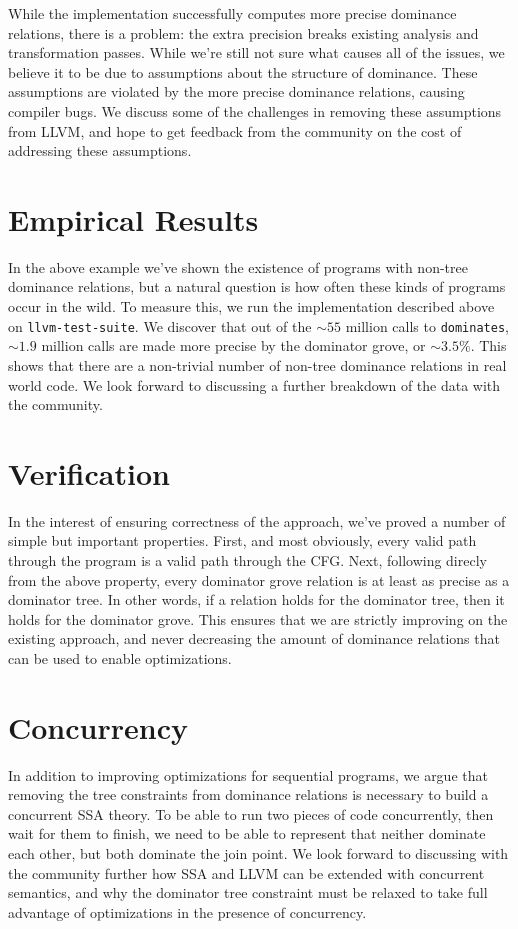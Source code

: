\documentclass[a4paper,twocolumn]{article}
\begin{document}
While the implementation successfully computes more precise dominance
relations, there is a problem: the extra precision breaks existing analysis and
transformation passes. While we're still not sure what causes all of the issues, 
we believe it to be due to assumptions about the structure of dominance. These
assumptions are violated by the more precise dominance relations, causing
compiler bugs. We discuss some of the challenges in removing these assumptions
from LLVM, and hope to get feedback from the community on the cost of addressing
these assumptions.

\section*{Empirical Results}
In the above example we've shown the existence of programs with non-tree
dominance relations, but a natural question is how often these kinds of
programs occur in the wild. To measure this, we run the implementation
described above on \texttt{llvm-test-suite}. We discover that out of the
$\sim55$ million calls to \texttt{dominates}, $\sim1.9$ million calls are made
more precise by the dominator grove, or $\sim3.5\%$. This shows that there are
a non-trivial number of non-tree dominance relations in real world code. We
look forward to discussing a further breakdown of the data with the community.

\section*{Verification}
In the interest of ensuring correctness of the approach, we've proved a number
of simple but important properties. First, and most obviously, every valid path 
through the program is a valid path through the CFG. Next, following direcly
from the above property, every dominator grove relation is at least as precise 
as a dominator tree. In other words, if a relation holds for the dominator tree, 
then it holds for the dominator grove. This ensures that we are strictly
improving on the existing approach, and never decreasing the amount of
dominance relations that can be used to enable optimizations.

\section*{Concurrency}
In addition to improving optimizations for sequential programs, we argue that 
removing the tree constraints from dominance relations is necessary to build a
concurrent SSA theory. To be able to run two pieces of code concurrently, then
wait for them to finish, we need to be able to represent that neither dominate
each other, but both dominate the join point. We look forward to discussing
with the community further how SSA and LLVM can be extended with concurrent
semantics, and why the dominator tree constraint must be relaxed to take full
advantage of optimizations in the presence of concurrency.
\end{document}

